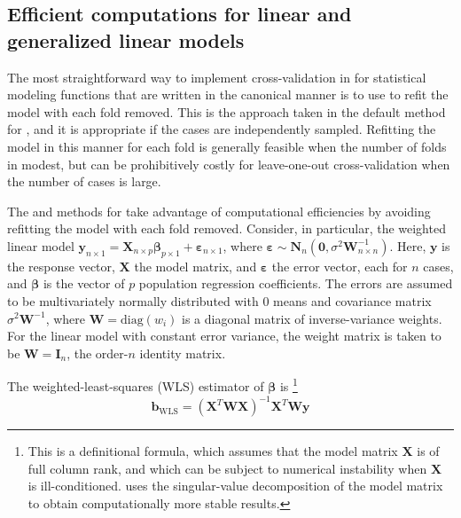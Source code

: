 \documentclass[
]{jss}
\begin{document}
\hypertarget{efficient-computations-for-linear-and-generalized-linear-models}{%
\subsection{Efficient computations for linear and generalized linear
models}\label{efficient-computations-for-linear-and-generalized-linear-models}}

The most straightforward way to implement cross-validation in
 for statistical modeling functions that are written in the
canonical manner is to use  to refit the model with each
fold removed. This is the approach taken in the default method for
, and it is appropriate if the cases are independently
sampled. Refitting the model in this manner for each fold is generally
feasible when the number of folds in modest, but can be prohibitively
costly for leave-one-out cross-validation when the number of cases is
large.

The  and  methods for  take advantage
of computational efficiencies by avoiding refitting the model with each
fold removed. Consider, in particular, the weighted linear model
\(\mathbf{y}_{n \times 1} = \mathbf{X}_{n \times p}\boldsymbol{\beta}_{p \times 1} + \boldsymbol{\varepsilon}_{n \times 1}\),
where
\(\boldsymbol{\varepsilon} \sim \mathbf{N}_n \left(\mathbf{0}, \sigma^2 \mathbf{W}^{-1}_{n \times n}\right)\).
Here, \(\mathbf{y}\) is the response vector, \(\mathbf{X}\) the model
matrix, and \(\boldsymbol{\varepsilon}\) the error vector, each for
\(n\) cases, and \(\boldsymbol{\beta}\) is the vector of \(p\)
population regression coefficients. The errors are assumed to be
multivariately normally distributed with 0 means and covariance matrix
\(\sigma^2 \mathbf{W}^{-1}\), where \(\mathbf{W} = \mathrm{diag}(w_i)\)
is a diagonal matrix of inverse-variance weights. For the linear model
with constant error variance, the weight matrix is taken to be
\(\mathbf{W} = \mathbf{I}_n\), the order-\(n\) identity matrix.

The weighted-least-squares (WLS) estimator of \(\boldsymbol{\beta}\) is
\citep[see, e.g.,][Sec. 12.2.2]{Fox:2016} \footnote{This is a
  definitional formula, which assumes that the model matrix
  \(\mathbf{X}\) is of full column rank, and which can be subject to
  numerical instability when \(\mathbf{X}\) is ill-conditioned.
   uses the singular-value decomposition of the model matrix
  to obtain computationally more stable results.} \[
\mathbf{b}_{\mathrm{WLS}} = \left( \mathbf{X}^T \mathbf{W} \mathbf{X} \right)^{-1} 
  \mathbf{X}^T \mathbf{W} \mathbf{y}
\]
\end{document}
